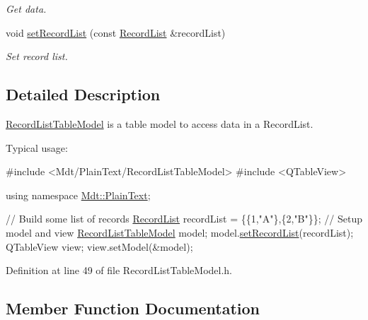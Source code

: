 \begin{DoxyCompactItemize}
\begin{DoxyCompactList}\small\item\em Get data. \end{DoxyCompactList}\item 
void \hyperlink{class_mdt_1_1_plain_text_1_1_record_list_table_model_ad12757d9766a6e1530cfeb20039dfff6}{set\+Record\+List} (const \hyperlink{class_mdt_1_1_plain_text_1_1_record_list_template}{Record\+List} \&record\+List)
\begin{DoxyCompactList}\small\item\em Set record list. \end{DoxyCompactList}\end{DoxyCompactItemize}


\subsection{Detailed Description}
\hyperlink{class_mdt_1_1_plain_text_1_1_record_list_table_model}{Record\+List\+Table\+Model} is a table model to access data in a Record\+List. 

Typical usage\+: 
\begin{DoxyCode}
\textcolor{preprocessor}{#include <Mdt/PlainText/RecordListTableModel>}
\textcolor{preprocessor}{#include <QTableView>}

\textcolor{keyword}{using namespace }\hyperlink{namespace_mdt_1_1_plain_text}{Mdt::PlainText};

\textcolor{comment}{// Build some list of records}
\hyperlink{class_mdt_1_1_plain_text_1_1_record_list_template}{RecordList} recordList = \{\{1,\textcolor{stringliteral}{"A"}\},\{2,\textcolor{stringliteral}{"B"}\}\};
\textcolor{comment}{// Setup model and view}
\hyperlink{class_mdt_1_1_plain_text_1_1_record_list_table_model}{RecordListTableModel} model;
model.\hyperlink{class_mdt_1_1_plain_text_1_1_record_list_table_model_ad12757d9766a6e1530cfeb20039dfff6}{setRecordList}(recordList);
QTableView view;
view.setModel(&model);
\end{DoxyCode}
 

Definition at line 49 of file Record\+List\+Table\+Model.\+h.



\subsection{Member Function Documentation}
